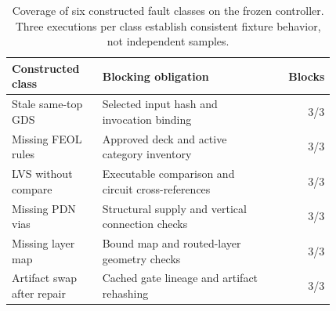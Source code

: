 \begin{table}[htbp]\centering\small\setlength{\tabcolsep}{4pt}
\caption{Coverage of six constructed fault classes on the frozen controller. Three executions per class establish consistent fixture behavior, not independent samples.}\label{tab:frozenfaults}
\begin{tabular}{@{}p{0.28\linewidth}p{0.54\linewidth}r@{}}\toprule
Constructed class & Blocking obligation & Blocks \\
\midrule
Stale same-top GDS & Selected input hash and invocation binding & 3/3 \\
Missing FEOL rules & Approved deck and active category inventory & 3/3 \\
LVS without compare & Executable comparison and circuit cross-references & 3/3 \\
Missing PDN vias & Structural supply and vertical connection checks & 3/3 \\
Missing layer map & Bound map and routed-layer geometry checks & 3/3 \\
Artifact swap after repair & Cached gate lineage and artifact rehashing & 3/3 \\
\bottomrule\end{tabular}\end{table}
